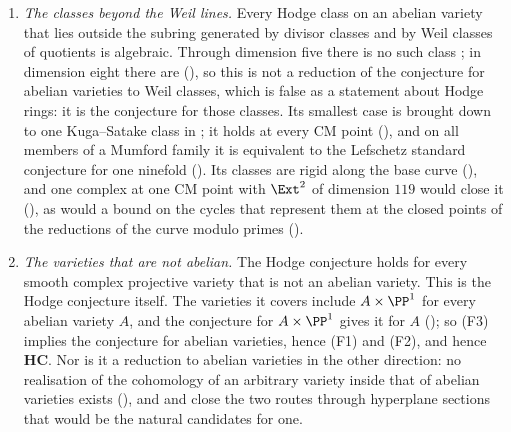 \begin{corollary}
\begin{enumerate}[label=\textup{(F\arabic*)},leftmargin=3.0em,itemsep=4pt]
  variety (). The bounded criterion \textup{(P1)} is not a
  second form of the same demand: by
   it is equivalent to the conclusion it was to imply,
  and  shows that the one cycle it could have been tested
  on, the transport of the base cycle, does not satisfy it.
\item \emph{The classes beyond the Weil lines.} Every Hodge class on an
  abelian variety that lies outside the subring generated by divisor classes
  and by Weil classes of quotients is algebraic. Through dimension five there
  is no such class \cite{MZ99}; in dimension eight there are
  (), so this is not a reduction of the conjecture
  for abelian varieties to Weil classes, which is false as a statement about
  Hodge rings: it is the conjecture for those classes. Its smallest case is
  brought down to one Kuga--Satake class in ; it holds at
  every CM point (), and on all members of a Mumford
  family it is equivalent to the Lefschetz standard conjecture for one
  ninefold (). Its classes are rigid along the base
  curve (), and one complex at one CM point with
  $\Ext^{2}$ of dimension $119$ would close it (),
  as would a bound on the cycles that represent them at the closed points of
  the reductions of the curve modulo primes ().
\item \emph{The varieties that are not abelian.} The Hodge conjecture holds
  for every smooth complex projective variety that is not an abelian variety.
  This is the Hodge conjecture itself. The varieties it covers include
  $A\times\PP^{1}$ for every abelian variety $A$, and the conjecture for
  $A\times\PP^{1}$ gives it for $A$ (); so (F3) implies
  the conjecture for abelian varieties, hence (F1) and (F2), and hence
  $\mathbf{HC}$. Nor is it a reduction to abelian varieties in the other
  direction: no realisation of the cohomology of an arbitrary variety inside
  that of abelian varieties exists (), and
   and  close the two routes
  through hyperplane sections that would be the natural candidates for one.
\end{enumerate}
\end{corollary}

